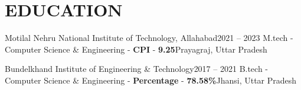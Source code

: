 \section{EDUCATION} {
    \resumeSubHeadingListStart
        \resumeSubheading
            {Motilal Nehru National Institute of Technology, Allahabad}{2021 -- 2023}
            {M.tech - Computer Science \& Engineering - \textbf{CPI} - \textbf{9.25}}{Prayagraj, Uttar Pradesh}
    \resumeSubHeadingListEnd

    \vspace{-10pt}
    \resumeSubHeadingListStart
        \resumeSubheading
            {Bundelkhand Institute of Engineering \& Technology}{2017 -- 2021}
            {B.tech - Computer Science \& Engineering  - \textbf{Percentage} - \textbf{78.58\%}}{Jhansi, Uttar Pradesh}
    \resumeSubHeadingListEnd
    
    
}